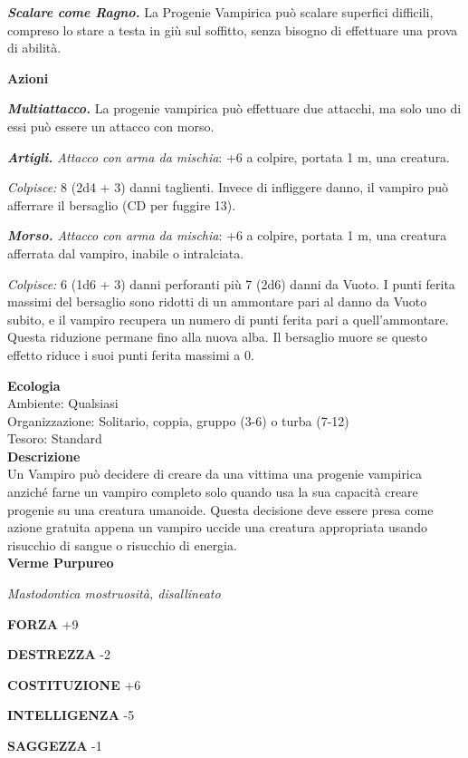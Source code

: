 \begin{multicols}{2}
\emph{\textbf{Scalare come Ragno.}} La Progenie Vampirica può scalare superfici difficili, compreso lo stare a testa in giù sul soffitto, senza bisogno di effettuare una prova di abilità.

\textbf{Azioni}

\emph{\textbf{Multiattacco.}} La progenie vampirica può effettuare due attacchi, ma solo uno di essi può essere un attacco con morso.

\emph{\textbf{Artigli.} Attacco con arma da mischia}: +6 a colpire, portata 1 m, una creatura.

\emph{Colpisce:} 8 (2d4 + 3) danni taglienti. Invece di infliggere danno, il vampiro può afferrare il bersaglio (CD per fuggire 13). 

\emph{\textbf{Morso.} Attacco con arma da mischia}: +6 a colpire, portata 1 m, una creatura afferrata dal vampiro, inabile o intralciata.

\emph{Colpisce:} 6 (1d6 + 3) danni perforanti più 7 (2d6) danni da Vuoto. I punti ferita massimi del bersaglio sono ridotti di un ammontare pari al danno da Vuoto subito, e il vampiro recupera un numero di punti ferita pari a quell'ammontare. Questa riduzione permane fino alla nuova alba. Il bersaglio muore se questo effetto riduce i suoi punti ferita massimi a 0.

\textbf{Ecologia}\\
Ambiente: Qualsiasi\\
Organizzazione: Solitario, coppia, gruppo (3-6) o turba (7-12)\\
Tesoro: Standard\\
\textbf{Descrizione}\\
Un Vampiro può decidere di creare da una vittima una progenie vampirica anziché farne un vampiro completo solo quando usa la sua capacità creare progenie su una creatura umanoide. Questa decisione deve essere presa come azione gratuita appena un vampiro uccide una creatura appropriata usando risucchio di sangue o risucchio di energia. \\


\medskip{}\textbf{Verme Purpureo}

\emph{Mastodontica mostruosità, disallineato}

\textbf{FORZA} +9

\textbf{DESTREZZA} -2

\textbf{COSTITUZIONE} +6

\textbf{INTELLIGENZA} -5

\textbf{SAGGEZZA} -1


\end{multicols}
